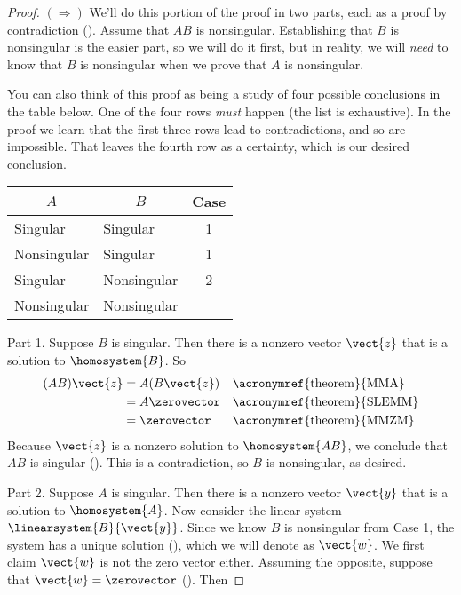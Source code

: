 \begin{proof}
$(\Rightarrow)$\quad
We'll do this portion of the proof in two parts, each as a proof by contradiction ().  Assume that $AB$ is nonsingular. Establishing that $B$ is nonsingular is the easier part, so we will do it first, but in reality, we will {\em need} to know that $B$ is nonsingular when we prove that $A$ is nonsingular.\par
%
You can also think of this proof as being a study of four possible conclusions in the table below.  One of the four rows {\em must} happen (the list is exhaustive).  In the proof we learn that the first three rows lead to contradictions, and so are impossible.  That leaves the fourth row as a certainty, which is our desired conclusion.
%
\begin{center}
\begin{tabular}{l|l|c}
\multicolumn{1}{c}{$A$}&
\multicolumn{1}{c}{$B$}&
\multicolumn{1}{c}{Case}\\\hline\hline
Singular&Singular&1\\\hline
Nonsingular&Singular&1\\\hline
Singular&Nonsingular&2\\\hline
Nonsingular&Nonsingular&
\end{tabular}
\end{center}
%
Part 1.  Suppose $B$ is singular.  Then there is a nonzero vector $\vect{z}$ that is a solution to $\homosystem{B}$.  So
%
\begin{align*}
(AB)\vect{z}
&=A(B\vect{z})&&\text{\acronymref{theorem}{MMA}}\\
&=A\zerovector&&\text{\acronymref{theorem}{SLEMM}}\\
&=\zerovector&&\text{\acronymref{theorem}{MMZM}}\\
\end{align*}
%
Because $\vect{z}$ is a nonzero solution to $\homosystem{AB}$,  we conclude that $AB$ is singular ().  This is a contradiction, so $B$ is nonsingular, as desired.\par
%
Part 2.  Suppose $A$ is singular.  Then there is a nonzero vector $\vect{y}$ that is a solution to $\homosystem{A}$.  Now consider the linear system $\linearsystem{B}{\vect{y}}$.  Since we know $B$ is nonsingular from Case 1, the system has a unique solution (), which we will denote as $\vect{w}$.  We first claim $\vect{w}$ is not the zero vector either.  Assuming the opposite, suppose that $\vect{w}=\zerovector$ ().  Then

\end{proof}
